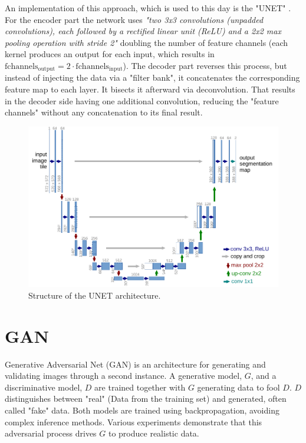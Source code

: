 An implementation of this approach, which is used to this day is the "UNET" \cite{ronneberger2015unetconvolutionalnetworksbiomedical}. For the encoder part the network uses \textit{"two 3x3 convolutions (unpadded convolutions), each followed by
a rectified linear unit (ReLU) and a 2x2 max pooling operation with stride 2"} \cite{ronneberger2015unetconvolutionalnetworksbiomedical} doubling the number of feature channels (each kernel produces an output for each input, which results in $\text{fchannels}_{\text{output}} = 2 \cdot \text{fchannels}_{\text{input}}$). The decoder part reverses this process, but instead of injecting the data via a "filter bank", it concatenates the corresponding feature map to each layer. It bisects it afterward via deconvolution. That results in the decoder side having one additional convolution, reducing the "feature channels" without any concatenation to its final result.

\begin{figure}[H]
  \centering
  \includegraphics[width=\textwidth]{figures/background/u-net-illustration-correct-scale2.pdf}
  \caption{Structure of the UNET architecture. \cite{ronneberger2015unetconvolutionalnetworksbiomedical}}
  \label{fig:unet}
  \clearpage
\end{figure}

\section{GAN}
\label{sec:gan}
Generative Adversarial Net (GAN) \cite{goodfellow2014generativeadversarialnetworks} is an architecture for generating and validating images through a second instance. A generative model, $G$, and a discriminative model, $D$ are trained together with $G$ generating data to fool $D$. $D$ distinguishes between "real" (Data from the training set) and generated, often called "fake" data. Both models are trained using backpropagation, avoiding complex inference methods. Various experiments demonstrate \cite{zhao2024exploring} \cite{karras2018progressivegrowinggansimproved} that this adversarial process drives $G$ to produce realistic data. 

